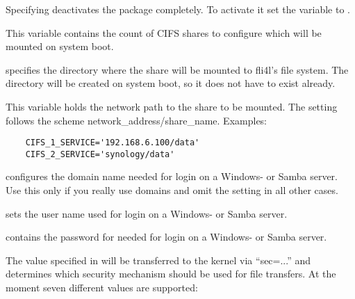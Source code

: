 \begin{description}

  Specifying  deactivates the package completely.
  To activate it set the variable  to 
  .

  This variable contains the count of CIFS shares to configure which will be
  mounted on system boot.

   specifies the directory where the share
  will be mounted to fli4l's file system. The directory will be created on
  system boot, so it does not have to exist already.

  This variable holds the network path to the share to be mounted. The setting
  follows the scheme network\_address/share\_name. Examples:
  \begin{example}
  \begin{verbatim}
    CIFS_1_SERVICE='192.168.6.100/data'
    CIFS_2_SERVICE='synology/data'
  \end{verbatim}
  \end{example}

   configures the domain name needed for login
  on a Windows- or Samba server. Use this only if you really use domains and
  omit the setting in all other cases.

   sets the user name used for login on a Windows- or Samba server.

   contains the password for 
  needed for login on a Windows- or Samba server.

  The value specified in  will be transferred to the kernel
  via ``sec=...'' and determines which security mechanism should be used for file transfers.
  At the moment seven different values are supported:


\end{description}
